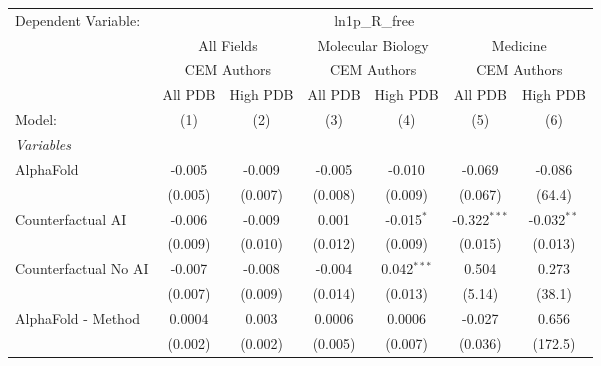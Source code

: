 \begingroup
\centering
\begin{tabular}{lcccccc}
   \tabularnewline \midrule \midrule
   Dependent Variable: & \multicolumn{6}{c}{ln1p\_R\_free}\\
 & \multicolumn{2}{c}{All Fields} & \multicolumn{2}{c}{Molecular Biology} & \multicolumn{2}{c}{Medicine} \\
\cmidrule(lr){2-3} \cmidrule(lr){4-5} \cmidrule(lr){6-7}
 & \multicolumn{2}{c}{CEM Authors} & \multicolumn{2}{c}{CEM Authors} & \multicolumn{2}{c}{CEM Authors} \\
\cmidrule(lr){2-3} \cmidrule(lr){4-5} \cmidrule(lr){6-7}
 & \multicolumn{1}{c}{All PDB} & \multicolumn{1}{c}{High PDB} & \multicolumn{1}{c}{All PDB} & \multicolumn{1}{c}{High PDB} & \multicolumn{1}{c}{All PDB} & \multicolumn{1}{c}{High PDB} \\
\cmidrule(lr){2-2} \cmidrule(lr){3-3} \cmidrule(lr){4-4} \cmidrule(lr){5-5} \cmidrule(lr){6-6} \cmidrule(lr){7-7}
   Model:                                                     & (1)            & (2)           & (3)     & (4)            & (5)            & (6)\\  
   \midrule
   \emph{Variables}\\
   AlphaFold                                                  & -0.005         & -0.009        & -0.005  & -0.010         & -0.069         & -0.086\\   
                                                              & (0.005)        & (0.007)       & (0.008) & (0.009)        & (0.067)        & (64.4)\\   
   Counterfactual AI                                          & -0.006         & -0.009        & 0.001   & -0.015$^{*}$   & -0.322$^{***}$ & -0.032$^{**}$\\   
                                                              & (0.009)        & (0.010)       & (0.012) & (0.009)        & (0.015)        & (0.013)\\   
   Counterfactual No AI                                       & -0.007         & -0.008        & -0.004  & 0.042$^{***}$  & 0.504          & 0.273\\   
                                                              & (0.007)        & (0.009)       & (0.014) & (0.013)        & (5.14)         & (38.1)\\   
   AlphaFold - Method                                         & 0.0004         & 0.003         & 0.0006  & 0.0006         & -0.027         & 0.656\\   
                                                              & (0.002)        & (0.002)       & (0.005) & (0.007)        & (0.036)        & (172.5)\\   

\end{tabular}
